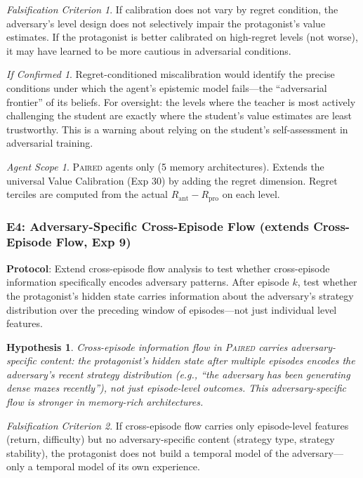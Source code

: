 \documentclass[11pt,a4paper]{article}
\newtheorem{hypothesis}{Hypothesis}[subsection]
\theoremstyle{remark}
\newtheorem*{falsification}{Falsification Criterion}
\newtheorem*{implication}{If Confirmed}
\newtheorem*{agentscope}{Agent Scope}
\newcommand{\paired}{\textsc{Paired}}
\newcommand{\Rpro}{R_{\text{pro}}}
\newcommand{\Rant}{R_{\text{ant}}}
\begin{document}
\begin{falsification}
If calibration does not vary by regret condition, the adversary's level design does not selectively impair the protagonist's value estimates. If the protagonist is better calibrated on high-regret levels (not worse), it may have learned to be more cautious in adversarial conditions.
\end{falsification}

\begin{implication}
Regret-conditioned miscalibration would identify the precise conditions under which the agent's epistemic model fails---the ``adversarial frontier'' of its beliefs. For oversight: the levels where the teacher is most actively challenging the student are exactly where the student's value estimates are least trustworthy. This is a warning about relying on the student's self-assessment in adversarial training.
\end{implication}

\begin{agentscope}
\paired{} agents only (5 memory architectures). Extends the universal Value Calibration (Exp 30) by adding the regret dimension. Regret terciles are computed from the actual $\Rant - \Rpro$ on each level.
\end{agentscope}

\subsubsection{E4: Adversary-Specific Cross-Episode Flow (extends Cross-Episode Flow, Exp 9)}
\label{exp:e4}

\textbf{Protocol}: Extend cross-episode flow analysis to test whether cross-episode information specifically encodes adversary patterns. After episode $k$, test whether the protagonist's hidden state carries information about the adversary's strategy distribution over the preceding window of episodes---not just individual level features.

\begin{hypothesis}
Cross-episode information flow in \paired{} carries adversary-specific content: the protagonist's hidden state after multiple episodes encodes the adversary's recent strategy distribution (e.g., ``the adversary has been generating dense mazes recently''), not just episode-level outcomes. This adversary-specific flow is stronger in memory-rich architectures.
\end{hypothesis}

\begin{falsification}
If cross-episode flow carries only episode-level features (return, difficulty) but no adversary-specific content (strategy type, strategy stability), the protagonist does not build a temporal model of the adversary---only a temporal model of its own experience.
\end{falsification}
\end{document}
